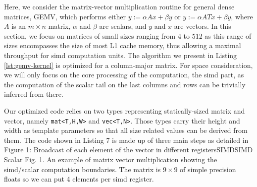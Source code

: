 \documentclass[../main]{subfiles}
\begin{document}
Here, we consider the matrix-vector multiplication routine
for general dense matrices, GEMV, which performs either
$y := \alpha A x + \beta y$ or $y := \alpha A T x + \beta y$,
where $A$ is an $m \times n$ matrix, $\alpha$ and $\beta$ are scalars,
and $y$ and $x$ are vectors. In this section,
we focus on matrices of small sizes ranging from
4 to 512 as this range of sizes encompasses the size of
most L1 cache memory, thus allowing a maximal throughput
for \gls{simd} computation units. The algorithm we present in
Listing \ref{lst:gemv-kernel} is optimized for a column-major matrix.
For space consideration, we will only focus on the core processing of
the computation, \ie the \gls{simd} part, as the computation of
the scalar tail on the last columns and rows can be trivially
inferred from there.

Our optimized code relies on two types representing
statically-sized matrix and vector, namely \lstinline{mat<T,H,W>}
and \lstinline{vec<T,N>}. Those types carry their height and width
as template parameters so that all size related values can be
derived from them. The code shown in Listing 7 is made up
of three main steps as detailed in Figure 1:
Broadcast of each element of
the vector in different registersSIMDSIMD Scalar
Fig. 1. An example of matrix vector multiplication showing the \gls{simd}/scalar
computation boundaries. The matrix is $9 \times 9$
of simple precision floats so we
can put 4 elements per \gls{simd} register.
\end{document}
